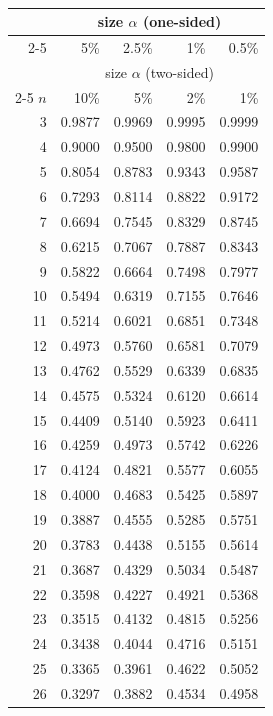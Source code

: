 ~\\
\noindent
\begin{minipage}[t]{0.49\textwidth}
	\centering
	\setlength{\tabcolsep}{10pt}
	\renewcommand{\arraystretch}{1.03}
	\begin{tabular}{rrrrr}
		& \multicolumn{4}{c}{size $\alpha$ (one-sided)} \\
		\cline{2-5}
		& 5\% & 2.5\% & 1\% & 0.5\% \\
		& \multicolumn{4}{c}{size $\alpha$ (two-sided)} \\
		\cline{2-5}
		$n$ & 10\% & 5\% & 2\% & 1\% \\
		\midrule
		3 & 0.9877 & 0.9969 & 0.9995 & 0.9999 \\
		4 & 0.9000 & 0.9500 & 0.9800 & 0.9900 \\
		5 & 0.8054 & 0.8783 & 0.9343 & 0.9587 \\
		6 & 0.7293 & 0.8114 & 0.8822 & 0.9172 \\
		7 & 0.6694 & 0.7545 & 0.8329 & 0.8745 \\
		8 & 0.6215 & 0.7067 & 0.7887 & 0.8343 \\
		9 & 0.5822 & 0.6664 & 0.7498 & 0.7977 \\[5pt]
		10 & 0.5494 & 0.6319 & 0.7155 & 0.7646 \\
		11 & 0.5214 & 0.6021 & 0.6851 & 0.7348 \\
		12 & 0.4973 & 0.5760 & 0.6581 & 0.7079 \\
		13 & 0.4762 & 0.5529 & 0.6339 & 0.6835 \\
		14 & 0.4575 & 0.5324 & 0.6120 & 0.6614 \\
		15 & 0.4409 & 0.5140 & 0.5923 & 0.6411 \\
		16 & 0.4259 & 0.4973 & 0.5742 & 0.6226 \\
		17 & 0.4124 & 0.4821 & 0.5577 & 0.6055 \\
		18 & 0.4000 & 0.4683 & 0.5425 & 0.5897 \\
		19 & 0.3887 & 0.4555 & 0.5285 & 0.5751 \\[5pt]
		20 & 0.3783 & 0.4438 & 0.5155 & 0.5614 \\
		21 & 0.3687 & 0.4329 & 0.5034 & 0.5487 \\
		22 & 0.3598 & 0.4227 & 0.4921 & 0.5368 \\
		23 & 0.3515 & 0.4132 & 0.4815 & 0.5256 \\
		24 & 0.3438 & 0.4044 & 0.4716 & 0.5151 \\
		25 & 0.3365 & 0.3961 & 0.4622 & 0.5052 \\
		26 & 0.3297 & 0.3882 & 0.4534 & 0.4958 \\

\end{tabular}
\end{minipage}
